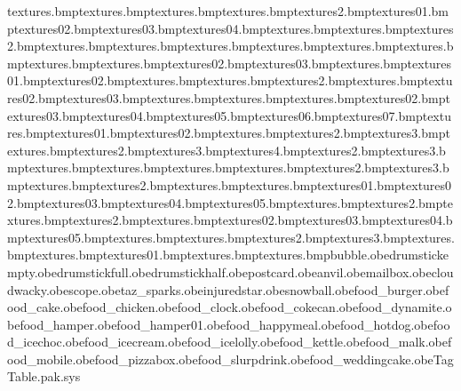 textures\postcard.bmp textures\stamp.bmp textures\keeperbutton.bmp textures\rope.bmp textures\manyan2.bmp textures\sub01.bmp textures\sub02.bmp textures\sub03.bmp textures\sub04.bmp textures\wings.bmp textures\bee.bmp textures\bigpizza2.bmp textures\bigpizza.bmp textures\burgbun.bmp textures\burgmeat.bmp textures\burgtom.bmp textures\cake.bmp textures\can.bmp textures\canhole.bmp textures\chicken.bmp textures\chicken02.bmp textures\chicken03.bmp textures\chickleg.bmp textures\choc01.bmp textures\choc02.bmp textures\chocblu.bmp textures\chocwap.bmp textures\chocwap2.bmp textures\clock.bmp textures\clock02.bmp textures\clock03.bmp textures\clockbell.bmp textures\clockhammer.bmp textures\clubsandwich.bmp textures\clubsandwich02.bmp textures\clubsandwich03.bmp textures\clubsandwich04.bmp textures\clubsandwich05.bmp textures\clubsandwich06.bmp textures\clubsandwich07.bmp textures\dynamite.bmp textures\dynamite01.bmp textures\dynamite02.bmp textures\fries.bmp textures\fries2.bmp textures\fries3.bmp textures\hamper.bmp textures\hamper2.bmp textures\hamper3.bmp textures\hamper4.bmp textures\hampfod2.bmp textures\hampfod3.bmp textures\hampfood.bmp textures\hamplid.bmp textures\happymeal.bmp textures\hotdog.bmp textures\iceloll2.bmp textures\iceloll3.bmp textures\icelolly.bmp textures\icewafe2.bmp textures\icewafer.bmp textures\kettle.bmp textures\kettle01.bmp textures\kettle02.bmp textures\kettle03.bmp textures\kettle04.bmp textures\kettle05.bmp textures\melon.bmp textures\melon2.bmp textures\milk.bmp textures\milk2.bmp textures\phone.bmp textures\phone02.bmp textures\phone03.bmp textures\phone04.bmp textures\phone05.bmp textures\pizza.bmp textures\slurp.bmp textures\slurp2.bmp textures\slurp3.bmp textures\tabletop.bmp textures\wedcake.bmp textures\wedcake01.bmp textures\wedcakejane.bmp textures\wedcaketon.bmp bubble.obe drumstickempty.obe drumstickfull.obe drumstickhalf.obe postcard.obe anvil.obe mailbox.obe cloudwacky.obe scope.obe taz_sparks.obe injuredstar.obe snowball.obe food_burger.obe food_cake.obe food_chicken.obe food_clock.obe food_cokecan.obe food_dynamite.obe food_hamper.obe food_hamper01.obe food_happymeal.obe food_hotdog.obe food_icechoc.obe food_icecream.obe food_icelolly.obe food_kettle.obe food_malk.obe food_mobile.obe food_pizzabox.obe food_slurpdrink.obe food_weddingcake.obe TagTable.pak.sys 